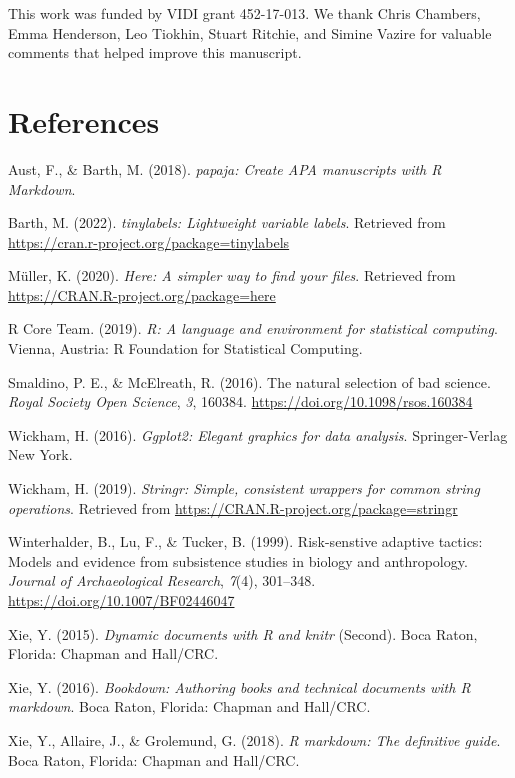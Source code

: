 \documentclass[british,,man,floatsintext]{apa6}
\begin{document}
This work was funded by VIDI grant 452-17-013. We thank Chris Chambers, Emma Henderson, Leo Tiokhin, Stuart Ritchie, and Simine Vazire for valuable comments that helped improve this manuscript.

\hypertarget{references}{%
\section{References}\label{references}}

\setlength{\parindent}{-0.2in}
\setlength{\leftskip}{0.2in}

\hypertarget{refs}{}
\leavevmode\hypertarget{ref-R-papaja}{}%
Aust, F., \& Barth, M. (2018). \emph{papaja: Create APA manuscripts with R Markdown}.

\leavevmode\hypertarget{ref-R-tinylabels}{}%
Barth, M. (2022). \emph{tinylabels: Lightweight variable labels}. Retrieved from \url{https://cran.r-project.org/package=tinylabels}

\leavevmode\hypertarget{ref-R-here}{}%
Müller, K. (2020). \emph{Here: A simpler way to find your files}. Retrieved from \url{https://CRAN.R-project.org/package=here}

\leavevmode\hypertarget{ref-R-base}{}%
R Core Team. (2019). \emph{R: A language and environment for statistical computing}. Vienna, Austria: R Foundation for Statistical Computing.

\leavevmode\hypertarget{ref-Smaldino2016}{}%
Smaldino, P. E., \& McElreath, R. (2016). The natural selection of bad science. \emph{Royal Society Open Science}, \emph{3}, 160384. \url{https://doi.org/10.1098/rsos.160384}

\leavevmode\hypertarget{ref-R-ggplot2}{}%
Wickham, H. (2016). \emph{Ggplot2: Elegant graphics for data analysis}. Springer-Verlag New York.

\leavevmode\hypertarget{ref-R-stringr}{}%
Wickham, H. (2019). \emph{Stringr: Simple, consistent wrappers for common string operations}. Retrieved from \url{https://CRAN.R-project.org/package=stringr}

\leavevmode\hypertarget{ref-Winterhalder1999}{}%
Winterhalder, B., Lu, F., \& Tucker, B. (1999). Risk-senstive adaptive tactics: Models and evidence from subsistence studies in biology and anthropology. \emph{Journal of Archaeological Research}, \emph{7}(4), 301--348. \url{https://doi.org/10.1007/BF02446047}

\leavevmode\hypertarget{ref-R-knitr}{}%
Xie, Y. (2015). \emph{Dynamic documents with R and knitr} (Second). Boca Raton, Florida: Chapman and Hall/CRC.

\leavevmode\hypertarget{ref-R-bookdown}{}%
Xie, Y. (2016). \emph{Bookdown: Authoring books and technical documents with R markdown}. Boca Raton, Florida: Chapman and Hall/CRC.

\leavevmode\hypertarget{ref-R-rmarkdown}{}%
Xie, Y., Allaire, J., \& Grolemund, G. (2018). \emph{R markdown: The definitive guide}. Boca Raton, Florida: Chapman and Hall/CRC.
\end{document}

